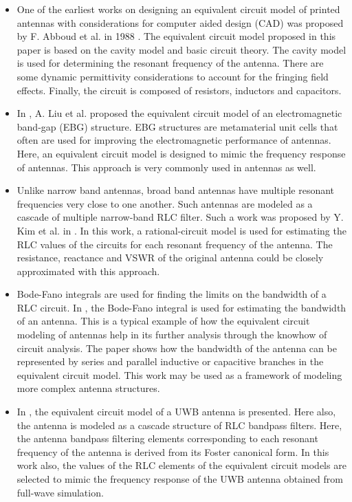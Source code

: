 \begin{itemize}
\item One of the earliest works on designing an equivalent circuit model of printed antennas with considerations for computer aided design (CAD) was proposed by F. Abboud et al. in 1988 \cite{RectEqCkt-der}. The equivalent circuit model proposed in this paper is based on the cavity model and basic circuit theory. The cavity model is used for determining the resonant frequency of the antenna. There are some dynamic permittivity considerations to account for the fringing field effects. Finally, the circuit is composed of resistors, inductors and capacitors.
\item In \cite{mtm_ebg_eqckt2}, A. Liu et al. proposed the equivalent circuit model of an electromagnetic band-gap (EBG) structure. EBG structures are metamaterial unit cells that often are used for improving the electromagnetic performance of antennas. Here, an equivalent circuit model is designed to mimic the frequency response of antennas. This approach is very commonly used in antennas as well.
\item Unlike narrow band antennas, broad band antennas have multiple resonant frequencies very close to one another. Such antennas are modeled as a cascade of multiple narrow-band RLC filter. Such a work was proposed by Y. Kim et al. in \cite{Broadband_EqCkt}. In this work, a rational-circuit model is used for estimating the RLC values of the circuits for each resonant frequency of the antenna. The resistance, reactance and VSWR of the original antenna could be closely approximated with this approach.
\item Bode-Fano integrals are used for finding the limits on the bandwidth of a RLC circuit. In \cite{Fano_BW_Antenna}, the Bode-Fano integral is used for estimating the bandwidth of an antenna. This is a typical example of how the equivalent circuit modeling of antennas help in its further analysis through the knowhow of circuit analysis. The paper shows how the bandwidth of the antenna can be represented by series and parallel inductive or capacitive branches in the equivalent circuit model. This work may be used as a framework of modeling more complex antenna structures.
\item In \cite{UwbEqCktMethod}, the equivalent circuit model of a UWB antenna is presented. Here also, the antenna is modeled as a cascade structure of RLC bandpass filters. Here, the antenna bandpass filtering elements corresponding to each resonant frequency of the antenna is derived from its Foster canonical form. In this work also, the values of the RLC elements of the equivalent circuit models are selected to mimic the frequency response of the UWB antenna obtained from full-wave simulation.

\end{itemize}
